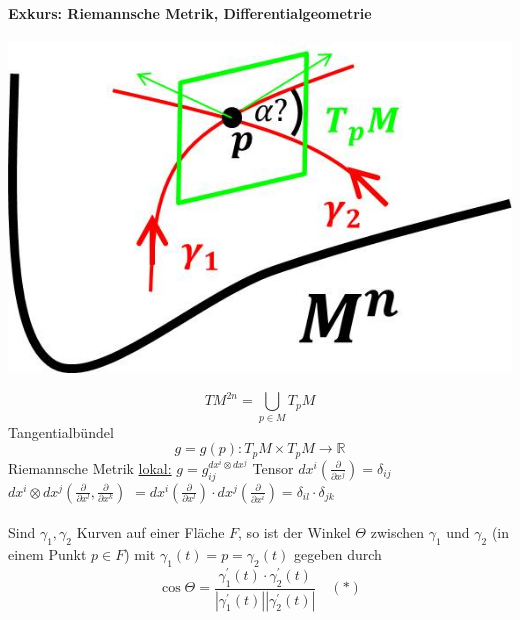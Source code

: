 \documentclass[a4paper,11pt,notitlepage]{report}
\theoremstyle{definition}
\newcommand{\R}{{\ensuremath{\mathbb{R}}}}
\newenvironment{definition}[1]{
	\begin{definitions}
	\marginnote{\emph{#1}}
}{\end{definitions}}
\begin{document}
\paragraph{Exkurs: Riemannsche Metrik, Differentialgeometrie}
\begin{center}
	\includegraphics[scale=0.4]{images/2012_01_24_Bild2.jpg}
\end{center}
$$TM^{2n} = \bigcup\limits_{p \in M}{T_pM}$$ Tangentialbündel
\newline
$$g = g(p) \colon T_pM \times T_pM \rightarrow \R$$ Riemannsche Metrik
\newline
\underline{lokal:} $g = g_{ij}^{ dx^i \otimes dx^j}$ Tensor \newline
$dx^i (\frac{\partial}{\partial x^j}) = \delta_{ij}$ \newline
$dx^i \otimes dx^j (\frac{\partial}{\partial x^l}, \frac{\partial}{\partial x^k})$
\newline
$= dx^i(\frac{\partial}{\partial x^l}) \cdot dx^j (\frac{\partial}{\partial x^i}) = \delta_{il} \cdot \delta_{jk}$

\paragraph{} %
\begin{definition}{Winkel}
	Sind $\gamma_1, \gamma_2$ Kurven auf einer Fläche $F$, so ist der Winkel $\Theta$ zwischen $\gamma_1$ und $\gamma_2$ (in einem Punkt $p \in F$) mit $\gamma_1(t) = p = \gamma_2(t)$ gegeben durch
	$$\cos \Theta = \frac{\gamma_1^\prime(t) \cdot \gamma_2^\prime(t)}{|\gamma_1^\prime(t)| |\gamma_2^\prime(t)|} \quad (*)$$
\end{definition}
\end{document}
